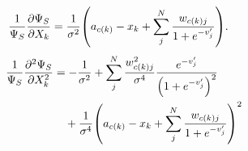 \documentclass[Thesis.tex]{subfiles}
\begin{document}
\begin{align}
    \frac{1}{\Psi_S} \pdv{\Psi_S}{X_k} &= \frac{1}{\sigma^2}\qty(a_{c(k)}-x_k +
    \sum_j^N \frac{w_{c(k)j}}{1+e^{-v_j'}}).\label{eq:rbm-sym-first-order-deriv}
\end{align}
\begin{align}
    \begin{split}
    \frac{1}{\Psi_S}\pdv[2]{\Psi_S}{X_k}
        &= -\frac{1}{\sigma^2} + \sum_j^N
        \frac{w_{c(k)j}^2}{\sigma^4}
        \frac{e^{-v_j'}}{\qty(1+e^{-v_j'})^2} \\
        &\quad{   } +
        \frac{1}{\sigma^4}\qty(a_{c(k)}-x_k+\sum_j^N
        \frac{w_{{c(k)}j}}{1+e^{-v_j'}})^2
    \end{split}\label{eq:rbm-sym-second-deriv}
\end{align}
\end{document}
